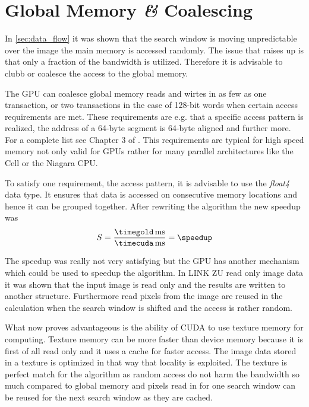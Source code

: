 \section{Global Memory \textit{\&} Coalescing} 
\label{sec:coalescing}
In \autoref{sec:data_flow} it was shown that the search window is moving
unpredictable over the image the main memory is accessed randomly. The 
issue that raises up is that only a fraction of the bandwidth is utilized. 
Therefore it is advisable to clubb or coalesce the access to the
global memory. 

The \gls{GPU} can coalesce global memory reads and wirtes in as few as one
transaction, or two transactions in the case of 128-bit words when certain
access requirements are met. These requirements are e.g. that a specific
access pattern is realized, the address of a 64-byte segment is 64-byte aligned 
and further more. For a complete list see Chapter 3 of \citep{citeulike:6584051}.
This requirements are typical for high speed memory not only valid for \glspl{GPU}
rather for many parallel architectures like the Cell or the Niagara \gls{CPU}. 

To satisfy one requirement, the access pattern, it is advisable to use the
\emph{float4} data type. It ensures that data is accessed on consecutive
memory locations and hence it can be grouped together. After rewriting the 
algorithm the new speedup was 
\fpDiv{\speedup}{\timegold}{\timecuda}
\begin{equation*}\label{eq:speedup1}
	S = \frac{\unit[\timegold]{ms}}{\unit[\timecuda]{ms}} = \speedup
\end{equation*}

The speedup was really not very satisfying but the \gls{GPU} has another mechanism
which could be used to speedup the algorithm. In {\color{red} LINK ZU read only image data}
it was shown that the input image is read only and the results are written to another
structure. Furthermore read pixels from the image are reused in the calculation
when the search window is shifted and the access is rather random. 

What now proves advantageous is the ability of \gls{CUDA} to use texture memory
for computing. Texture memory can be more faster than device memory because it is
first of all read only and it uses a cache for faster access. The image data
stored in a texture is optimized in that way that locality is exploited. The
texture is perfect match for the algorithm as random access do not harm the bandwidth
so much compared to global memory and pixels read in for one search window can 
be reused for the next search window as they are cached. 

